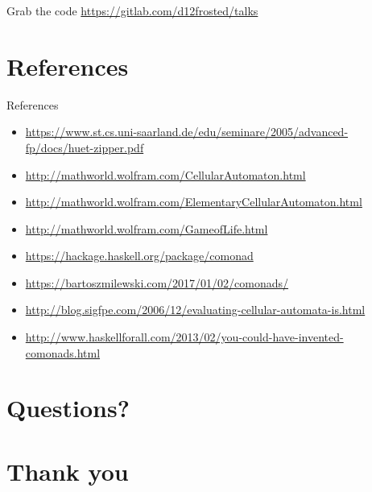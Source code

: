 \documentclass[presentation,aspectratio=169,smaller]{beamer}
\begin{document}
\begin{frame}[label={sec:orgf577d2b}]{Grab the code}
\url{https://gitlab.com/d12frosted/talks}
\end{frame}

\section*{References}
\label{sec:org0e4a340}
\begin{frame}[label={sec:org7ad1b32}]{References}
\begin{itemize}
\item \url{https://www.st.cs.uni-saarland.de/edu/seminare/2005/advanced-fp/docs/huet-zipper.pdf}
\item \url{http://mathworld.wolfram.com/CellularAutomaton.html}
\item \url{http://mathworld.wolfram.com/ElementaryCellularAutomaton.html}
\item \url{http://mathworld.wolfram.com/GameofLife.html}
\item \url{https://hackage.haskell.org/package/comonad}
\item \url{https://bartoszmilewski.com/2017/01/02/comonads/}
\item \url{http://blog.sigfpe.com/2006/12/evaluating-cellular-automata-is.html}
\item \url{http://www.haskellforall.com/2013/02/you-could-have-invented-comonads.html}
\end{itemize}
\end{frame}

\section{Questions?}
\label{sec:org3bd0d71}
\section{Thank you}
\label{sec:orged1467f}
\end{document}
